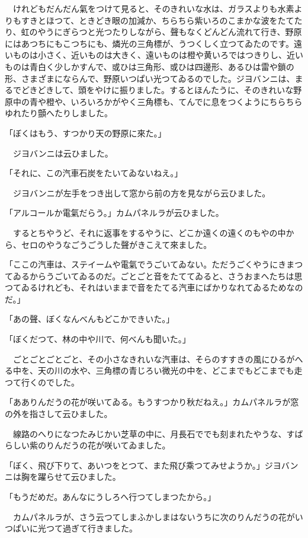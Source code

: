 \documentclass[tate,paper=b6j,jafontsize=9pt]{jlreq}
\begin{document}
　けれどもだんだん氣をつけて見ると、そのきれいな水は、ガラスよりも水素よりもすきとほつて、ときどき眼の加減か、ちらちら紫いろのこまかな波をたてたり、虹のやうにぎらつと光つたりしながら、聲もなくどんどん流れて行き、野原にはあつちにもこつちにも、燐光の三角標が、うつくしく立つてゐたのです。遠いものは小さく、近いものは大きく、遠いものは橙や黄いろではつきりし、近いものは青白く少しかすんで、或ひは三角形、或ひは四邊形、あるひは雷や鎖の形、さまざまにならんで、野原いつぱい光つてゐるのでした。ジヨバンニは、まるでどきどきして、頭をやけに振りました。するとほんたうに、そのきれいな野原中の青や橙や、いろいろかがやく三角標も、てんでに息をつくようにちらちらゆれたり顫へたりしました。

「ぼくはもう、すつかり天の野原に來た。」

　ジヨバンニは云ひました。

「それに、この汽車石炭をたいてゐないねえ。」

　ジヨバンニが左手をつき出して窓から前の方を見ながら云ひました。

「アルコールか電氣だらう。」カムパネルラが云ひました。

　するとちやうど、それに返事をするやうに、どこか遠くの遠くのもやの中から、セロのやうなごうごうした聲がきこえて來ました。

「ここの汽車は、ステイームや電氣でうごいてゐない。ただうごくやうにきまつてゐるからうごいてゐるのだ。ごとごと音をたててゐると、さうおまへたちは思つてゐるけれども、それはいままで音をたてる汽車にばかりなれてゐるためなのだ。」

「あの聲、ぼくなんべんもどこかできいた。」

「ぼくだつて、林の中や川で、何べんも聞いた。」

　ごとごとごとごと、その小さなきれいな汽車は、そらのすすきの風にひるがへる中を、天の川の水や、三角標の青じろい微光の中を、どこまでもどこまでも走つて行くのでした。

「あありんだうの花が咲いてゐる。もうすつかり秋だねえ。」カムパネルラが窓の外を指さして云ひました。

　線路のへりになつたみじかい芝草の中に、月長石ででも刻まれたやうな、すばらしい紫のりんだうの花が咲いてゐました。

「ぼく、飛び下りて、あいつをとつて、また飛び乘つてみせようか。」ジヨバンニは胸を躍らせて云ひました。

「もうだめだ。あんなにうしろへ行つてしまつたから。」

　カムパネルラが、さう云つてしまふかしまはないうちに次のりんだうの花がいつぱいに光つて過ぎて行きました。
\end{document}
